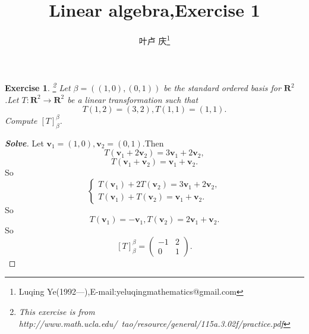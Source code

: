 \documentclass[a4paper]{article}
\newtheorem*{exe}{Exercise}
\newenvironment{exercise}
{\bigskip\begin{mdframed}\begin{exe}}
    {\end{exe}\end{mdframed}\bigskip}
\begin{document}
\title{\huge{\bf{Linear algebra,Exercise 1}}} \author{\small{叶卢
    庆\footnote{Luqing Ye(1992---),E-mail:yeluqingmathematics@gmail.com}}}
\maketitle
\begin{exercise}\footnote{This exercise is from http://www.math.ucla.edu/~tao/resource/general/115a.3.02f/practice.pdf}
Let $\beta=((1,0),(0,1))$ be the standard ordered basis for
$\mathbf{R}^2$.Let $T:\mathbf{R}^2\to \mathbf{R}^2$ be a linear
transformation such that 
$$
T(1,2)=(3,2),T(1,1)=(1,1).
$$
Compute $[T]_{\beta}^{\beta}$.
\end{exercise}
\begin{proof}[\textbf{Solve}]
Let $\mathbf{v}_1=(1,0),\mathbf{v}_2=(0,1)$.Then
$$
T(\mathbf{v}_1+2\mathbf{v}_2)=3\mathbf{v}_1+2\mathbf{v}_2,
$$
$$
T(\mathbf{v}_1+\mathbf{v}_2)=\mathbf{v}_1+\mathbf{v}_2.
$$
So
$$
\begin{cases}
  T(\mathbf{v}_1)+2T(\mathbf{v}_2)=3\mathbf{v}_1+2\mathbf{v}_2,\\
T(\mathbf{v}_1)+T(\mathbf{v}_2)=\mathbf{v}_1+\mathbf{v}_2.
\end{cases}
$$
So 
$$
T(\mathbf{v}_1)=-\mathbf{v}_1,T(\mathbf{v}_2)=2\mathbf{v}_1+\mathbf{v}_2.
$$
So
$$
[T]_{\beta}^{\beta}=\begin{pmatrix}
  -1&2\\
0&1
\end{pmatrix}.
$$
\end{proof}
\end{document}
